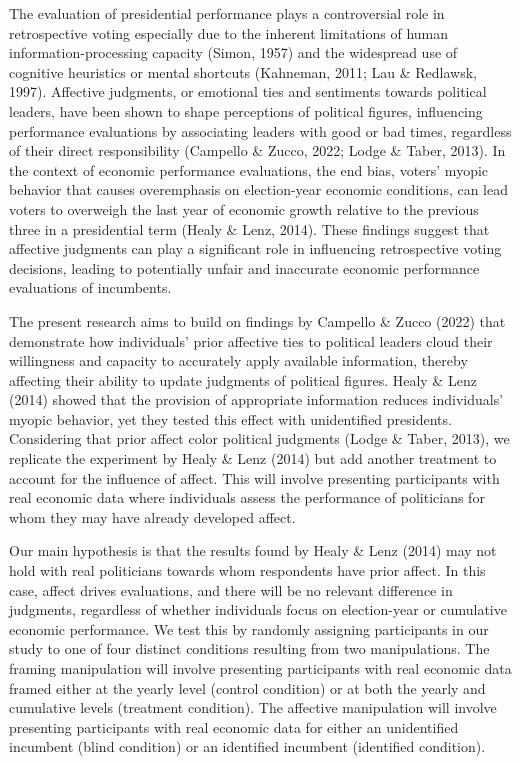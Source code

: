 \documentclass[
]{article}
\begin{document}
The evaluation of presidential performance plays a controversial role in
retrospective voting especially due to the inherent limitations of human
information-processing capacity (Simon, 1957) and the widespread use of
cognitive heuristics or mental shortcuts (Kahneman, 2011; Lau \&
Redlawsk, 1997). Affective judgments, or emotional ties and sentiments
towards political leaders, have been shown to shape perceptions of
political figures, influencing performance evaluations by associating
leaders with good or bad times, regardless of their direct
responsibility (Campello \& Zucco, 2022; Lodge \& Taber, 2013). In the
context of economic performance evaluations, the end bias, voters'
myopic behavior that causes overemphasis on election-year economic
conditions, can lead voters to overweigh the last year of economic
growth relative to the previous three in a presidential term (Healy \&
Lenz, 2014). These findings suggest that affective judgments can play a
significant role in influencing retrospective voting decisions, leading
to potentially unfair and inaccurate economic performance evaluations of
incumbents.

The present research aims to build on findings by Campello \& Zucco
(2022) that demonstrate how individuals' prior affective ties to
political leaders cloud their willingness and capacity to accurately
apply available information, thereby affecting their ability to update
judgments of political figures. Healy \& Lenz (2014) showed that the
provision of appropriate information reduces individuals' myopic
behavior, yet they tested this effect with unidentified presidents.
Considering that prior affect color political judgments (Lodge \& Taber,
2013), we replicate the experiment by Healy \& Lenz (2014) but add
another treatment to account for the influence of affect. This will
involve presenting participants with real economic data where
individuals assess the performance of politicians for whom they may have
already developed affect.

Our main hypothesis is that the results found by Healy \& Lenz (2014)
may not hold with real politicians towards whom respondents have prior
affect. In this case, affect drives evaluations, and there will be no
relevant difference in judgments, regardless of whether individuals
focus on election-year or cumulative economic performance. We test this
by randomly assigning participants in our study to one of four distinct
conditions resulting from two manipulations. The framing manipulation
will involve presenting participants with real economic data framed
either at the yearly level (control condition) or at both the yearly and
cumulative levels (treatment condition). The affective manipulation will
involve presenting participants with real economic data for either an
unidentified incumbent (blind condition) or an identified incumbent
(identified condition).
\end{document}
